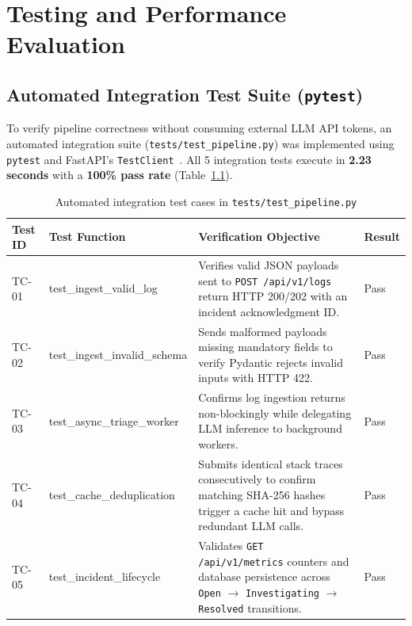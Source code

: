 \documentclass[12pt,a4paper,oneside]{report}
\begin{document}
\chapter{Testing and Performance Evaluation}

\section{Automated Integration Test Suite (\texttt{pytest})}
To verify pipeline correctness without consuming external LLM API tokens, an automated integration suite (\texttt{tests/test\_pipeline.py}) was implemented using \texttt{pytest} and FastAPI's \texttt{TestClient}~\cite{pytest}. All 5 integration tests execute in \textbf{2.23 seconds} with a \textbf{100\% pass rate} (Table~\ref{tab:tests}).

\begin{table}[H]
\centering\footnotesize\singlespacing
\caption{Automated integration test cases in \texttt{tests/test\_pipeline.py}}\label{tab:tests}
\begin{tabularx}{\linewidth}{@{}>{\raggedright\arraybackslash}p{1.6cm} >{\ttfamily\raggedright\arraybackslash}p{4.3cm} X l@{}}
\toprule
\textbf{Test ID} & \textbf{Test Function} & \textbf{Verification Objective} & \textbf{Result}\\
\midrule
TC-01 & test\_ingest\_valid\_log & Verifies valid JSON payloads sent to \texttt{POST /api/v1/logs} return HTTP 200/202 with an incident acknowledgment ID. & Pass\\
TC-02 & test\_ingest\_invalid\_schema & Sends malformed payloads missing mandatory fields to verify Pydantic rejects invalid inputs with HTTP 422. & Pass\\
TC-03 & test\_async\_triage\_worker & Confirms log ingestion returns non-blockingly while delegating LLM inference to background workers. & Pass\\
TC-04 & test\_cache\_deduplication & Submits identical stack traces consecutively to confirm matching SHA-256 hashes trigger a cache hit and bypass redundant LLM calls. & Pass\\
TC-05 & test\_incident\_lifecycle & Validates \texttt{GET /api/v1/metrics} counters and database persistence across \texttt{Open} $\rightarrow$ \texttt{Investigating} $\rightarrow$ \texttt{Resolved} transitions. & Pass\\
\bottomrule
\end{tabularx}
\end{table}
\end{document}
